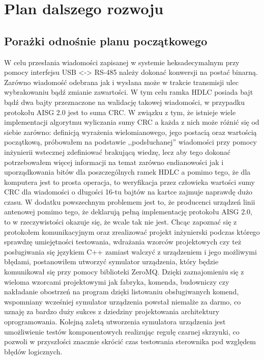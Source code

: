 \chapter{Plan dalszego rozwoju}
\section{Porażki odnośnie planu początkowego}
    W celu przesłania wiadomości zapisanej w systemie heksadecymalnym przy pomocy interfejsu USB <-> RS-485
    należy dokonać konwersji na postać binarną. Zarówno wiadomość odebrana jak i wysłana może w trakcie transmisji ulec wybrakowaniu bądź
    zmianie zawartości. W tym celu ramka HDLC posiada bajt bądź dwa bajty przeznaczone na walidację takowej wiadomości, w przypadku protokołu
    AISG 2.0 jest to suma CRC. W związku z tym, że istnieje wiele implementacji algorytmu wyliczania sumy CRC a każda z nich może różnić się od siebie zarówno:
    definicją wyrażenia wielomianowego, jego postacią oraz wartością początkową, próbowałem na podstawie ,,podsłuchanej'' wiadomości przy pomocy
    inżynierii wstecznej zdefiniować brakującą wiedzę, lecz aby tego dokonać potrzebowałem więcej informacji na temat zarówno endianowości
    jak i uporządkowania bitów dla poszczególnych ramek HDLC a pomimo tego, że dla komputera jest to prosta operacja, to weryfikacja przez człowieka
    wartości sumy CRC dla wiadomości o długości 16-tu bajtów na kartce zajmuje naprawdę dużo czasu. W dodatku powszechnym problemem jest to, że 
    producenci urządzeń linii antenowej pomimo tego, że deklarują pełną implementację protokołu AISG 2.0, to w rzeczywistości okazuje się, że
    wcale tak nie jest. Chcąc zapoznać się z protokołem komunikacyjnym oraz zrealizować projekt inżynierski podczas którego sprawdzę umiejętności testowania,
    wdrażania wzorców projektowych czy też posługiwania się językiem C++ zamiast walczyć z urządzeniem i jego możliwymi błędami, postanowiłem
    utworzyć symulator urządzenia, który będzie komunikował się przy pomocy biblioteki ZeroMQ. Dzięki zaznajomieniu się z wieloma wzorcami projektowymi
    jak fabryka, komenda, budowniczy czy nakładanie obostrzeń na program dzięki listowaniu obsługiwanych komend, wspomniany wcześniej
    symulator urządzenia powstał niemalże za darmo, co uznaję za bardzo duży sukces z dziedziny projektowania architektury oprogramowania.
    Kolejną zaletą utworzenia symulatora urządzenia jest umożliwienie testów komponentowych realizując regułę czarnej skrzynki, co pozwoli w przyszłości
    znacznie skrócić czas testowania sterownika pod względem błędów logicznych.
